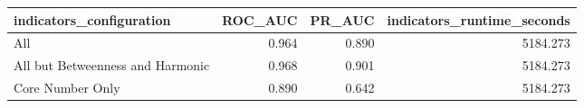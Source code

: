 \begin{tabular}{lrrr}
\toprule
indicators\_configuration & ROC\_AUC & PR\_AUC & indicators\_runtime\_seconds \\
\midrule
All & 0.964 & 0.890 & 5184.273 \\
All but Betweenness and Harmonic & 0.968 & 0.901 & 5184.273 \\
Core Number Only & 0.890 & 0.642 & 5184.273 \\
\bottomrule
\end{tabular}
